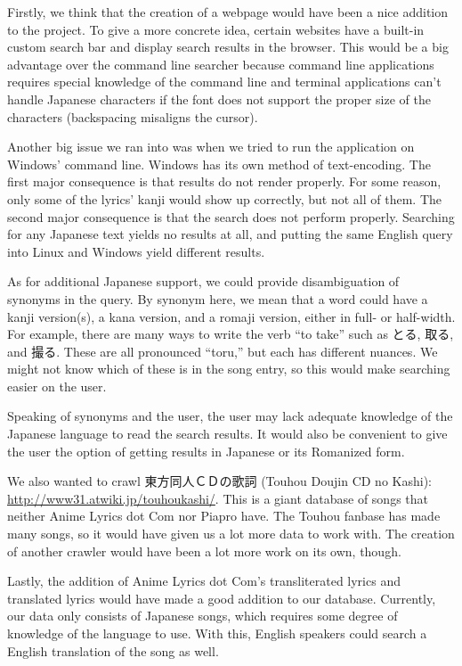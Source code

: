 \documentclass{acm} %
\begin{document}
\begin{CJK}{UTF8}{zhsong}
Firstly, we think that the creation of a webpage would have been a nice addition to the project. To give a more concrete idea, certain websites have a built-in custom search bar and display search results in the browser. This would be a big advantage over the command line searcher because command line applications requires special knowledge of the command line and terminal applications can't handle Japanese characters if the font does not support the proper size of the characters (backspacing misaligns the cursor).

Another big issue we ran into was when we tried to run the application on Windows' command line. Windows has its own method of text-encoding. The first major consequence is that results do not render properly. For some reason, only some of the lyrics' kanji would show up correctly, but not all of them. The second major consequence is that the search does not perform properly. Searching for any Japanese text yields no results at all, and putting the same English query into Linux and Windows yield different results.

As for additional Japanese support, we could provide disambiguation of synonyms in the query. By synonym here, we mean that a word could have a kanji version(s), a kana version, and a romaji version, either in full- or half-width. For example, there are many ways to write the verb ``to take'' such as とる, 取る, and 撮る. These are all pronounced ``toru,'' but each has different nuances. We might not know which of these is in the song entry, so this would make searching easier on the user.

Speaking of synonyms and the user, the user may lack adequate knowledge of the Japanese language to read the search results. It would also be convenient to give the user the option of getting results in Japanese or its Romanized form.

We also wanted to crawl 東方同人ＣＤの歌詞 (Touhou Doujin CD no Kashi): \url{http://www31.atwiki.jp/touhoukashi/}. This is a giant database of songs that neither Anime Lyrics dot Com nor Piapro have. The Touhou fanbase has made many songs, so it would have given us a lot more data to work with. The creation of another crawler would have been a lot more work on its own, though.

Lastly, the addition of Anime Lyrics dot Com's transliterated lyrics and translated lyrics would have made a good addition to our database. Currently, our data only consists of Japanese songs, which requires some degree of knowledge of the language to use. With this, English speakers could search a English translation of the song as well.


\end{CJK}
\end{document}
